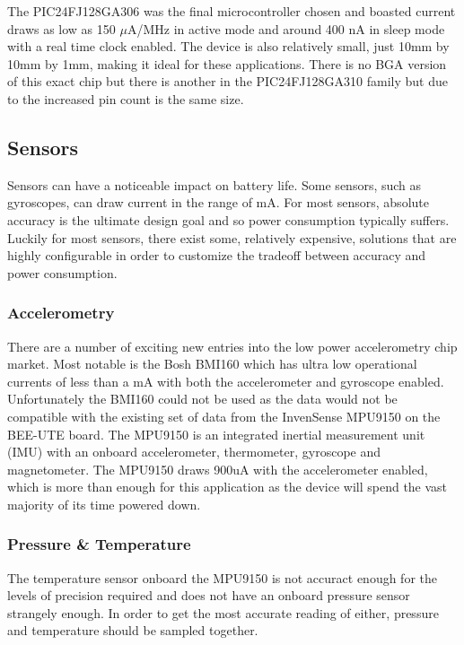 \documentclass[12pt,openany,a4paper]{book}
\begin{document}
		The PIC24FJ128GA306 was the final microcontroller chosen \cite{PIC24} and boasted current draws as low as 150 $\mu$A/MHz in active mode and around 400 nA in sleep mode with a real time clock enabled. The device is also relatively small, just 10mm by 10mm by 1mm, making it ideal for these applications. There is no BGA version of this exact chip but there is another in the PIC24FJ128GA310 family but due to the increased pin count is the same size.
		
		\newpage
		\subsection{Sensors}
		Sensors can have a noticeable impact on battery life. Some sensors, such as gyroscopes, can draw current in the range of mA. For most sensors, absolute accuracy is the ultimate design goal and so power consumption typically suffers. Luckily for most sensors, there exist some, relatively expensive, solutions that are highly configurable in order to customize the tradeoff between accuracy and power consumption. \\
		
			\subsubsection{Accelerometry}
			There are a number of exciting new entries into the low power accelerometry chip market. Most notable is the Bosh BMI160 \cite{bosch15} which has ultra low operational currents of less than a mA with both the accelerometer and gyroscope enabled. \\
			
			Unfortunately the BMI160 could not be used as the data would not be compatible with the existing set of data from the InvenSense MPU9150 \cite{InvenMPU9150} on the BEE-UTE board. The MPU9150 is an integrated inertial measurement unit (IMU) with an onboard accelerometer, thermometer, gyroscope and magnetometer. The MPU9150 draws 900uA with the accelerometer enabled, which is more than enough for this application as the device will spend the vast majority of its time powered down. 
			\subsubsection{Pressure \& Temperature}
			The temperature sensor onboard the MPU9150 is not accuract enough for the levels of precision required and does not have an onboard pressure sensor strangely enough. In order to get the most accurate reading of either, pressure and temperature should be sampled together. \\
			
\end{document}
